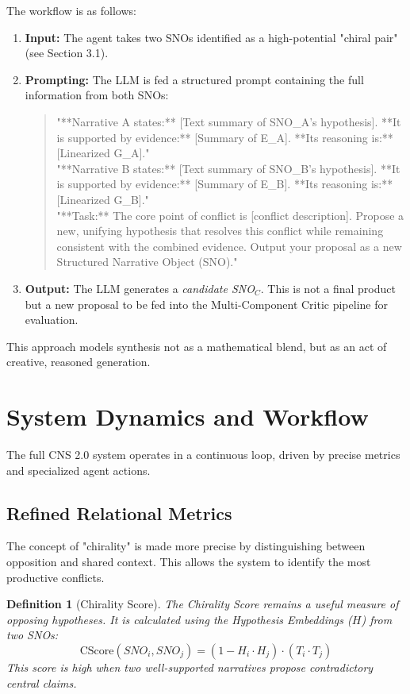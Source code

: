 \documentclass[12pt, a4paper]{article}
\newtheorem{definition}{Definition}[section]
\begin{document}
The workflow is as follows:
\begin{enumerate}
    \item \textbf{Input:} The agent takes two SNOs identified as a high-potential "chiral pair" (see Section 3.1).
    \item \textbf{Prompting:} The LLM is fed a structured prompt containing the full information from both SNOs:
        \begin{quote}
        "**Narrative A states:** [Text summary of SNO\_A's hypothesis]. **It is supported by evidence:** [Summary of E\_A]. **Its reasoning is:** [Linearized G\_A]." \\
        "**Narrative B states:** [Text summary of SNO\_B's hypothesis]. **It is supported by evidence:** [Summary of E\_B]. **Its reasoning is:** [Linearized G\_B]." \\
        "**Task:** The core point of conflict is [conflict description]. Propose a new, unifying hypothesis that resolves this conflict while remaining consistent with the combined evidence. Output your proposal as a new Structured Narrative Object (SNO)."
        \end{quote}
    \item \textbf{Output:} The LLM generates a \textit{candidate SNO$_C$}. This is not a final product but a new proposal to be fed into the Multi-Component Critic pipeline for evaluation.
\end{enumerate}
This approach models synthesis not as a mathematical blend, but as an act of creative, reasoned generation.

\section{System Dynamics and Workflow}
The full CNS 2.0 system operates in a continuous loop, driven by precise metrics and specialized agent actions.

\subsection{Refined Relational Metrics}
The concept of "chirality" is made more precise by distinguishing between opposition and shared context. This allows the system to identify the most productive conflicts.

\begin{definition}[Chirality Score]
The Chirality Score remains a useful measure of opposing \textit{hypotheses}. It is calculated using the Hypothesis Embeddings ($H$) from two SNOs:
\[
\text{CScore}(SNO_i, SNO_j) = (1 - H_i \cdot H_j) \cdot (T_i \cdot T_j)
\]
This score is high when two well-supported narratives propose contradictory central claims.
\end{definition}
\end{document}
